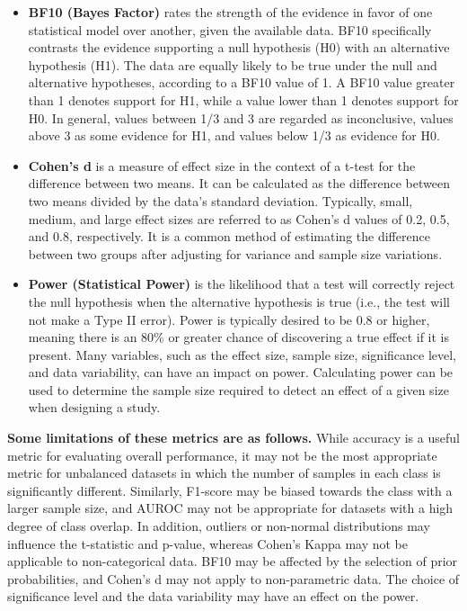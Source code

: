 \begin{itemize}
    \item \textbf{BF10 (Bayes Factor)} rates the strength of the evidence in favor of one statistical model over another, given the available data. BF10 specifically contrasts the evidence supporting a null hypothesis (H0) with an alternative hypothesis (H1). The data are equally likely to be true under the null and alternative hypotheses, according to a BF10 value of 1. A BF10 value greater than 1 denotes support for H1, while a value lower than 1 denotes support for H0. In general, values between 1/3 and 3 are regarded as inconclusive, values above 3 as some evidence for H1, and values below 1/3 as evidence for H0.
    \item \textbf{Cohen's d} is a measure of effect size in the context of a t-test for the difference between two means. It can be calculated as the difference between two means divided by the data's standard deviation. Typically, small, medium, and large effect sizes are referred to as Cohen's d values of 0.2, 0.5, and 0.8, respectively. It is a common method of estimating the difference between two groups after adjusting for variance and sample size variations.
    \item \textbf{Power (Statistical Power)} is the likelihood that a test will correctly reject the null hypothesis when the alternative hypothesis is true (i.e., the test will not make a Type II error). Power is typically desired to be 0.8 or higher, meaning there is an 80\% or greater chance of discovering a true effect if it is present. Many variables, such as the effect size, sample size, significance level, and data variability, can have an impact on power. Calculating power can be used to determine the sample size required to detect an effect of a given size when designing a study.
\end{itemize}
\textbf{Some limitations of these metrics are as follows.}
While accuracy is a useful metric for evaluating overall performance, it may not be the most appropriate metric for unbalanced datasets in which the number of samples in each class is significantly different. Similarly, F1-score may be biased towards the class with a larger sample size, and AUROC may not be appropriate for datasets with a high degree of class overlap. In addition, outliers or non-normal distributions may influence the t-statistic and p-value, whereas Cohen's Kappa may not be applicable to non-categorical data. BF10 may be affected by the selection of prior probabilities, and Cohen's d may not apply to non-parametric data. The choice of significance level and the data variability may have an effect on the power.
